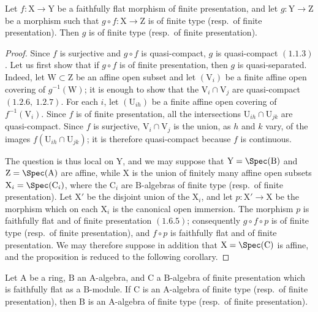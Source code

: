 \begin{proposition}[11.3.16]
\label{IV.11.3.16}
Let $f:\mathrm{X}\to\mathrm{Y}$ be a faithfully flat morphism of finite presentation, and let $g:\mathrm{Y}\to\mathrm{Z}$ be a morphism such that $g\circ f:\mathrm{X}\to\mathrm{Z}$ is of finite type (resp.\ of finite presentation). Then $g$ is of finite type (resp.\ of finite presentation).
\end{proposition}

\begin{proof}
Since $f$ is surjective and $g\circ f$ is quasi-compact, $g$ is quasi-compact $(1.1.3)$. Let us first show that if $g\circ f$ is of finite presentation, then $g$ is quasi-separated. Indeed, let $\mathrm{W}\subset\mathrm{Z}$ be an affine open subset and let $(\mathrm{V}_i)$ be a finite affine open covering of $g^{-1}(\mathrm{W})$; it is enough to show that the $\mathrm{V}_i\cap\mathrm{V}_j$ are quasi-compact $(1.2.6,\ 1.2.7)$. For each $i$, let $(\mathrm{U}_{ih})$ be a finite affine open covering of $f^{-1}(\mathrm{V}_i)$. Since $f$ is of finite presentation, all the intersections $\mathrm{U}_{ih}\cap\mathrm{U}_{jk}$ are quasi-compact. Since $f$ is surjective, $\mathrm{V}_i\cap\mathrm{V}_j$ is the union, as $h$ and $k$ vary, of the images $f(\mathrm{U}_{ih}\cap\mathrm{U}_{jk})$; it is therefore quasi-compact because $f$ is continuous.

The question is thus local on $\mathrm{Y}$, and we may suppose that $\mathrm{Y}=\Spec(\mathrm{B})$ and $\mathrm{Z}=\Spec(\mathrm{A})$ are affine, while $\mathrm{X}$ is the union of finitely many affine open subsets $\mathrm{X}_i=\Spec(\mathrm{C}_i)$, where the $\mathrm{C}_i$ are $\mathrm{B}$-algebras of finite type (resp.\ of finite presentation). Let $\mathrm{X}'$ be the disjoint union of the $\mathrm{X}_i$, and let $p:\mathrm{X}'\to\mathrm{X}$ be the morphism which on each $\mathrm{X}_i$ is the canonical open immersion. The morphism $p$ is faithfully flat and of finite presentation $(1.6.5)$; consequently $g\circ f\circ p$ is of finite type (resp.\ of finite presentation), and $f\circ p$ is faithfully flat and of finite presentation. We may therefore suppose in addition that $\mathrm{X}=\Spec(\mathrm{C})$ is affine, and the proposition is reduced to the following corollary.
\end{proof}

\begin{corollary}[11.3.17]
\label{IV.11.3.17}
Let $\mathrm{A}$ be a ring, $\mathrm{B}$ an $\mathrm{A}$-algebra, and $\mathrm{C}$ a $\mathrm{B}$-algebra of finite presentation which is faithfully flat as a $\mathrm{B}$-module. If $\mathrm{C}$ is an $\mathrm{A}$-algebra of finite type (resp.\ of finite presentation), then $\mathrm{B}$ is an $\mathrm{A}$-algebra of finite type (resp.\ of finite presentation).
\end{corollary}

